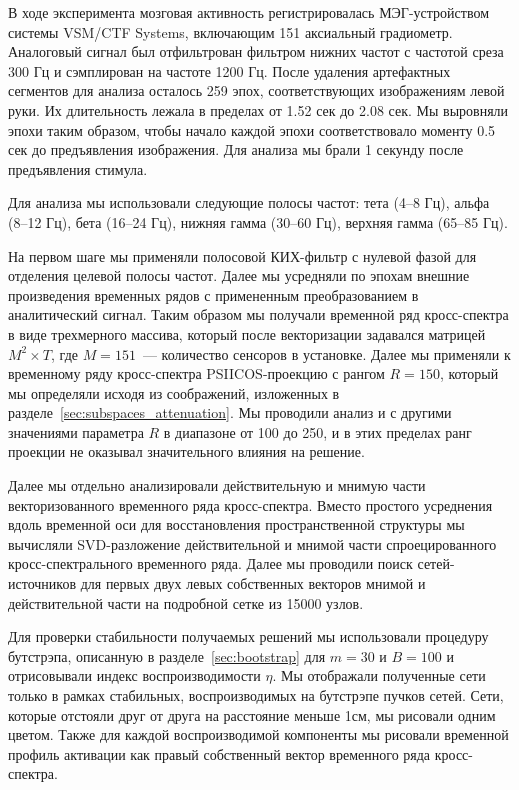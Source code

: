 В ходе эксперимента мозговая активность регистрировалась МЭГ-устройством
системы VSM/CTF Systems, включающим 151 аксиальный градиометр. Аналоговый
сигнал был отфильтрован  фильтром нижних частот с частотой среза 300 Гц и
сэмплирован на частоте 1200 Гц. После удаления артефактных сегментов для
анализа осталось 259 эпох, соответствующих изображениям левой руки. Их
длительность лежала в пределах от 1.52 сек до 2.08 сек. Мы выровняли эпохи
таким образом, чтобы начало каждой эпохи соответствовало моменту 0.5 сек до
предъявления изображения. Для анализа мы брали 1 секунду после предъявления
стимула.

Для анализа мы использовали следующие полосы частот: тета (4--8 Гц), альфа
(8--12 Гц), бета (16--24 Гц), нижняя гамма (30--60 Гц), верхняя гамма (65--85
Гц).

На первом шаге мы применяли полосовой КИХ-фильтр с нулевой фазой для отделения
целевой полосы частот. Далее мы усредняли по эпохам внешние произведения
временных рядов с примененным преобразованием в аналитический сигнал. Таким
образом мы получали временной ряд кросс-спектра в виде трехмерного массива,
который после векторизации задавался матрицей $M^2 \times T$, где $M=151$~---
количество сенсоров в установке. Далее мы применяли к временному ряду
кросс-спектра PSIICOS-проекцию с рангом $R=150$, который мы определяли исходя
из соображений, изложенных в разделе~\ref{sec:subspaces_attenuation}. Мы
проводили анализ и с другими значениями параметра $R$ в диапазоне от 100 до
250, и в этих пределах ранг проекции не оказывал значительного влияния на
решение.

Далее мы отдельно анализировали действительную и мнимую части векторизованного
временного ряда кросс-спектра. Вместо простого усреднения вдоль временной оси
для восстановления пространственной структуры мы вычисляли SVD-разложение
действительной и мнимой части спроецированного кросс-спектрального временного
ряда. Далее мы проводили поиск сетей-источников для первых двух левых
собственных векторов мнимой и действительной части на подробной сетке из 15000
узлов.

Для проверки стабильности получаемых решений мы использовали процедуру
бутстрэпа, описанную в разделе~\ref{sec:bootstrap} для $m=30$ и $B=100$ и
отрисовывали индекс воспроизводимости $\eta$.  Мы отображали полученные сети
только в рамках стабильных, воспроизводимых на бутстрэпе пучков сетей. Сети,
которые отстояли друг от друга на расстояние меньше 1см, мы рисовали одним
цветом.  Также для каждой воспроизводимой компоненты мы рисовали временной
профиль активации как правый собственный вектор временного ряда кросс-спектра.

